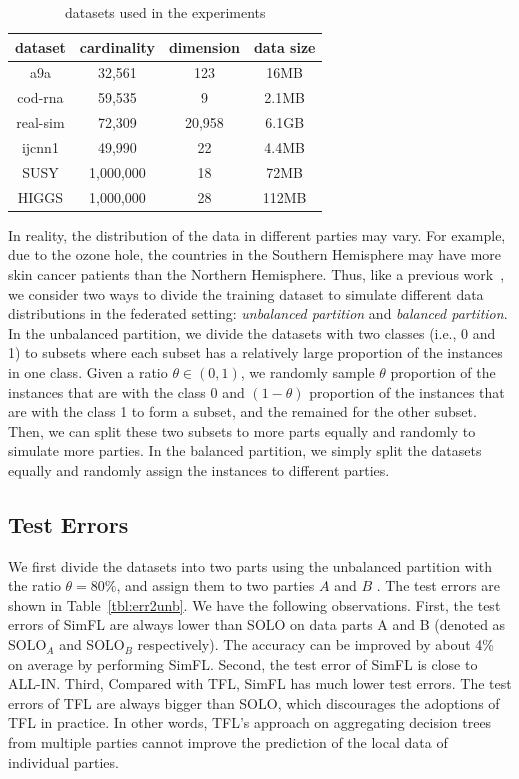 \documentclass[letterpaper]{article} %
\theoremstyle{definition}
\begin{document}
\begin{table}
\centering
\caption{datasets used in the experiments}
\label{tbl:dataset}
\begin{tabular}{|c|c|c|c|}
\hline
dataset  & cardinality & dimension &data size\\ \hline
a9a    & 32,561      & 123   &16MB    \\ \hline
cod-rna      & 59,535      & 9  &2.1MB     \\ \hline
real-sim & 72,309 &20,958 &6.1GB\\ \hline
ijcnn1 & 49,990 & 22 &4.4MB\\ \hline
SUSY & 1,000,000 & 18 &72MB\\ \hline
HIGGS  & 1,000,000 &28 &112MB\\ \hline
\end{tabular}
\end{table}


In reality, the distribution of the data in different parties may vary. For example, due to the ozone hole, the countries in the Southern Hemisphere may have more skin cancer patients than the Northern Hemisphere. Thus, like a previous work~\cite{pmlr-v97-yurochkin19a}, we consider two ways to divide the training dataset to simulate different data distributions in the federated setting: \emph{unbalanced partition} and \emph{balanced partition}. In the unbalanced partition, we divide the datasets with two classes (i.e., 0 and 1) to subsets where each subset has a relatively large proportion of the instances in one class. Given a ratio $\theta \in (0,1)$, we randomly sample $\theta$ proportion of the instances that are with the class 0 and $(1-\theta)$ proportion of the instances that are with the class 1 to form a subset, and the remained for the other subset. Then, we can split these two subsets to more parts equally and randomly to simulate more parties. In the balanced partition, we simply split the datasets equally and randomly assign the instances to different parties.

\subsection{Test Errors}
\label{sec:error}

We first divide the datasets into two parts using the unbalanced partition with the ratio $\theta=80\%$, and assign them to two parties $A$ and $B$ . The test errors are shown in Table~\ref{tbl:err2unb}. We have the following observations. First, the test errors of SimFL are always lower than SOLO on data parts A and B (denoted as SOLO$_A$ and SOLO$_B$ respectively). The accuracy can be improved by about 4\% on average by performing SimFL. Second, the test error of SimFL is close to ALL-IN.  Third, Compared with TFL, SimFL has much lower test errors. The test errors of TFL are always bigger than SOLO, which discourages the adoptions of TFL in practice. In other words, TFL's approach on aggregating decision trees from multiple parties cannot improve the prediction of the local data of individual parties.
\end{document}
